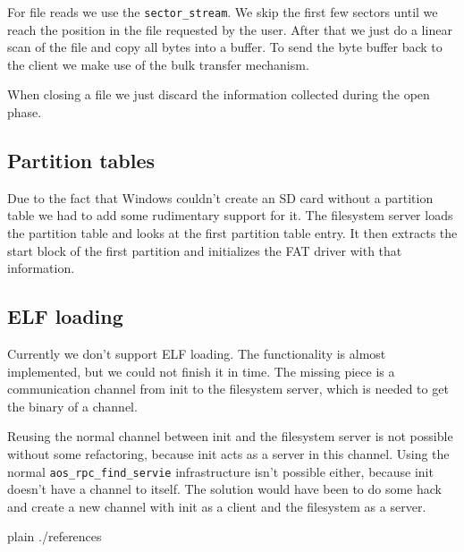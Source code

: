 \documentclass[a4paper,10pt]{article}
\begin{document}
For file reads we use the \lstinline!sector_stream!.
We skip the first few sectors until we reach the position in the file requested by the user.
After that we just do a linear scan of the file and copy all bytes into a buffer.
To send the byte buffer back to the client we make use of the bulk transfer mechanism.

When closing a file we just discard the information collected during the open phase.

\subsection{Partition tables}
Due to the fact that Windows couldn't create an SD card without a partition table we had to add some rudimentary support for it.
The filesystem server loads the partition table and looks at the first partition table entry.
It then extracts the start block of the first partition and initializes the FAT driver with that information.

\subsection{ ELF loading}

Currently we don't support ELF loading.
The functionality is almost implemented, but we could not finish it in time.
The missing piece is a communication channel from init to the filesystem server, which is needed to get the binary of a channel.

Reusing the normal channel between init and the filesystem server is not possible without some refactoring, because init acts as a server in this channel.
Using the normal \lstinline!aos_rpc_find_servie! infrastructure isn't possible either, because init doesn't have a channel to itself.
The solution would have been to do some hack and create a new channel with init as a client and the filesystem as a server.




\begin{flushleft}
{{{
 {plain}
 {./references}
}}}
\end{flushleft}


\todos
\end{document}
